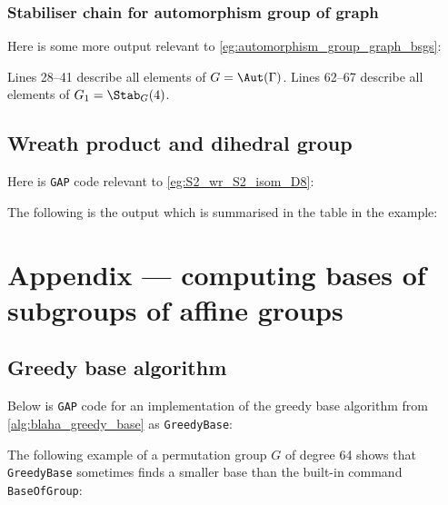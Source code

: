 

\subsection{Stabiliser chain for automorphism group of graph}

Here is some more output relevant to \autoref{eg:automorphism_group_graph_bsgs}:\label{app:automorphism_group_graph_bsgs}



Lines 28--41 describe all elements of $G = \Aut(\Gamma)$. Lines 62--67 describe all elements of $G_1 = \Stab_G(4)$.

\section{Wreath product and dihedral group}

Here is \texttt{GAP} code relevant to \autoref{eg:S2_wr_S2_isom_D8}:



The following is the output which is summarised in the table in the example:



\chapter{Appendix --- computing bases of subgroups of affine groups}%

\section{Greedy base algorithm}

Below is \texttt{GAP} code for an implementation of the greedy base algorithm from \autoref{alg:blaha_greedy_base} as \texttt{GreedyBase}:\label{app:greedy_base}



The following example of a permutation group $G$ of degree 64 shows that \texttt{GreedyBase} sometimes finds a smaller base than the built-in command \texttt{BaseOfGroup}:\label{app:greedy_better_than_default}



